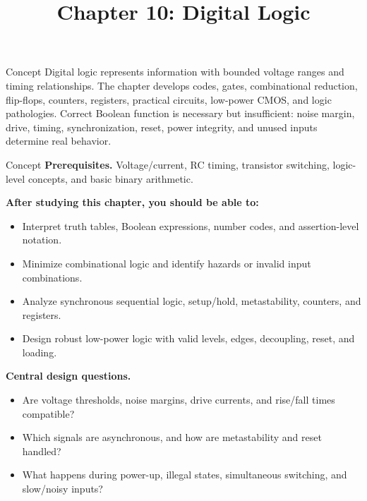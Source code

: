 \documentclass[10pt,letterpaper]{article}
\title{Chapter 10: Digital Logic}
\author{}
\date{}
\begin{document}
\maketitle

\begin{CornellOverviewBox}{Concept}
Digital logic represents information with bounded voltage ranges and timing relationships. The chapter develops codes, gates, combinational reduction, flip-flops, counters, registers, practical circuits, low-power CMOS, and logic pathologies. Correct Boolean function is necessary but insufficient: noise margin, drive, timing, synchronization, reset, power integrity, and unused inputs determine real behavior.
\end{CornellOverviewBox}
\begin{CornellOverviewBox}{Concept}
\textbf{Prerequisites.} Voltage/current, RC timing, transistor switching, logic-level concepts, and basic binary arithmetic.

\textbf{After studying this chapter, you should be able to:}
\begin{itemize}
  \item Interpret truth tables, Boolean expressions, number codes, and assertion-level notation.
  \item Minimize combinational logic and identify hazards or invalid input combinations.
  \item Analyze synchronous sequential logic, setup/hold, metastability, counters, and registers.
  \item Design robust low-power logic with valid levels, edges, decoupling, reset, and loading.
\end{itemize}\textbf{Central design questions.}
\begin{itemize}
  \item Are voltage thresholds, noise margins, drive currents, and rise/fall times compatible?
  \item Which signals are asynchronous, and how are metastability and reset handled?
  \item What happens during power-up, illegal states, simultaneous switching, and slow/noisy inputs?
\end{itemize}\end{CornellOverviewBox}
\end{document}

